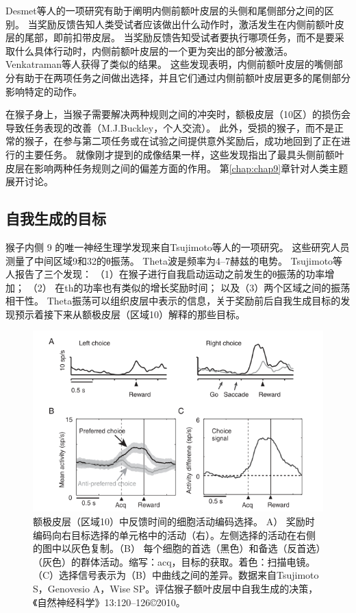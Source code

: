 Desmet等人\cite{desmet2011errors}的一项研究有助于阐明内侧前额叶皮层的头侧和尾侧部分之间的区别。
当奖励反馈告知人类受试者应该做出什么动作时，激活发生在内侧前额叶皮层的尾部，即前扣带皮层。
当奖励反馈告知受试者要执行哪项任务，而不是要采取什么具体行动时，内侧前额叶皮层的一个更为突出的部分被激活。
Venkatraman等人\cite{venkatraman2009resolving}获得了类似的结果。
这些发现表明，内侧前额叶皮层的嘴侧部分有助于在两项任务之间做出选择，并且它们通过内侧前额叶皮层更多的尾侧部分影响特定的动作。\par


在猴子身上，当猴子需要解决两种规则之间的冲突时，额极皮层（10区）的损伤会导致任务表现的改善（M.J.Buckley，个人交流）。
此外，受损的猴子，而不是正常的猴子，在参与第二项任务或在试验之间提供意外奖励后，成功地回到了正在进行的主要任务。
就像刚才提到的成像结果一样，这些发现指出了最具头侧前额叶皮层在影响两种任务规则之间的偏差方面的作用。
第\ref{chap:chap9}章针对人类主题展开讨论。\par



\subsection{自我生成的目标}

猴子内侧 9 的唯一神经生理学发现来自Tsujimoto等人\cite{tsujimoto2006direct}的一项研究。
这些研究人员测量了中间区域9和32的θ振荡。
Theta波是频率为4–7赫兹的电势。
Tsujimoto等人报告了三个发现：
（1）在猴子进行自我启动运动之前发生的θ振荡的功率增加；
（2） 在th的功率也有类似的增长奖励时间；
以及（3）两个区域之间的振荡相干性。
Theta振荡可以组织皮层中表示的信息，关于奖励前后自我生成目标的发现预示着接下来从额极皮层（区域10）解释的那些目标。\par


\begin{figure}[!htb]
	\centering
	\includegraphics{image_pfc/Fig_3_9}
	\caption{额极皮层（区域10）中反馈时间的细胞活动编码选择。
		A） 奖励时编码向右目标选择的单元格中的活动（右）。左侧选择的活动在右侧的图中以灰色复制。（B） 每个细胞的首选（黑色）和备选（反首选）（灰色）的群体活动。缩写：acq，目标的获取。着色：扫描电镜。（C）选择信号表示为（B）中曲线之间的差异。数据来自Tsujimoto S，Genovesio A，Wise SP。评估猴子额叶皮层中自我生成的决策，《自然神经科学》13:120–126©2010。}
	\label{fig:3_9}
\end{figure}



